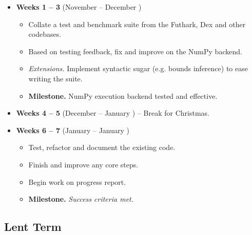 \begin{itemize}
    \item \textbf{Weeks 1 -- 3} (November  -- December ) \begin{itemize}
        \item Collate a test and benchmark suite from the Futhark, Dex and other codebases.
        \item Based on testing feedback, fix and improve on the NumPy backend.
        \item \textit{Extensions.} Implement syntactic sugar (e.g. bounds inference) to ease writing the suite. 
        \item \textbf{Milestone.} NumPy execution backend tested and effective.
    \end{itemize}

    \item \textbf{Weeks 4 -- 5} (December  -- January ) -- Break for Christmas.

    \item \textbf{Weeks 6 -- 7} (January  -- January ) \begin{itemize}
        \item Test, refactor and document the existing code.
        \item Finish and improve any core steps.
        \item Begin work on progress report.
        \item \textbf{Milestone.} \textit{Success criteria met.}
    \end{itemize}
\end{itemize}

\subsection{Lent Term}

